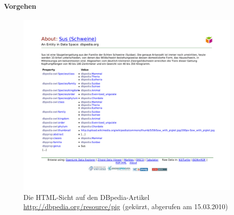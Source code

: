 % 
% 


\paragraph{Vorgehen}
\begin{figure}[tbh]
\includegraphics[width=1\textwidth]{img/pdf/pig_anfang.pdf}
\caption[]{Die HTML-Sicht auf den DBpedia-Artikel \url{http://dbpedia.org/resource/pig} (gekürzt, abgerufen am 15.03.2010)}
\label{fig:dbpedia-pig}
\end{figure}

